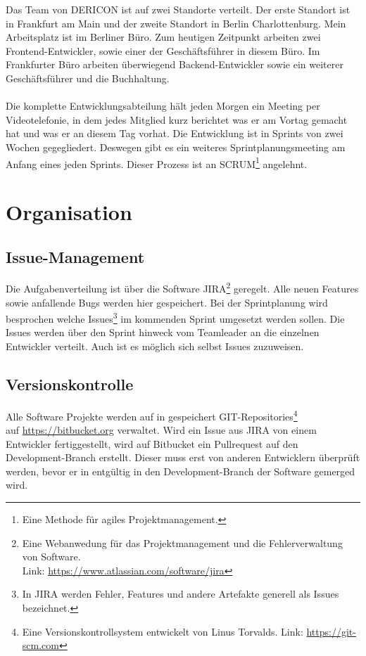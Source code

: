 \documentclass[chapterprefix=false, 12pt, a4paper, oneside, parskip=half, listof=totoc, bibliography=totoc, numbers=noendperiod]{scrbook}
\begin{document}
    Das Team von DERICON ist auf zwei Standorte verteilt. Der erste Standort ist in Frankfurt am Main und der zweite Standort in Berlin Charlottenburg.
    Mein Arbeitsplatz ist im Berliner Büro. Zum heutigen Zeitpunkt arbeiten zwei Frontend-Entwickler, sowie einer der Geschäftsführer in diesem Büro.
    Im Frankfurter Büro arbeiten überwiegend Backend-Entwickler sowie ein weiterer Geschäftsführer und die Buchhaltung.
    \\ \\
    Die komplette Entwicklungsabteilung hält jeden Morgen ein Meeting per Videotelefonie, in dem jedes Mitglied kurz berichtet
    was er am Vortag gemacht hat und was er an diesem Tag vorhat.
    Die Entwicklung ist in Sprints von zwei Wochen gegegliedert. Deswegen gibt es ein weiteres Sprintplanungsmeeting am Anfang eines jeden Sprints.
    Dieser Prozess ist an SCRUM\footnote{Eine Methode für agiles Projektmanagement.} angelehnt.

    \section{Organisation}

    \subsection{Issue-Management}

    Die Aufgabenverteilung ist über die Software JIRA\footnote{Eine Webanwedung für das Projektmanagement und die Fehlerverwaltung von Software. \\ Link: \url{https://www.atlassian.com/software/jira}} geregelt.
    Alle neuen Features sowie anfallende Bugs werden hier gespeichert.
    Bei der Sprintplanung wird besprochen welche Issues\footnote{In JIRA werden Fehler, Features und andere Artefakte generell als Issues bezeichnet.}
    im kommenden Sprint umgesetzt werden sollen. Die Issues werden über den Sprint hinweck vom Teamleader an die einzelnen Entwickler verteilt. Auch ist es möglich sich selbst Issues zuzuweisen.

    \pagebreak

    \subsection{Versionskontrolle}

    Alle Software Projekte werden auf in gespeichert GIT-Repositories\footnote{Eine Versionskontrollsystem entwickelt von Linus Torvalds. Link: \url{https://git-scm.com}} \\
    auf \url{https://bitbucket.org} verwaltet.
    Wird ein Issue aus JIRA von einem Entwickler fertiggestellt, wird auf Bitbucket ein Pullrequest auf den Development-Branch erstellt.
    Dieser muss erst von anderen Entwicklern überprüft werden, bevor er in entgültig in den Development-Branch der Software
    gemerged wird.
\end{document}
